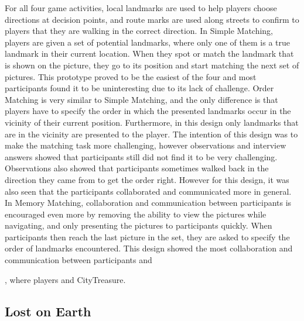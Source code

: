 For all four game activities, local landmarks are used to help players choose directions at decision points, and route marks are used along streets to confirm to players that they are walking in the correct direction. In Simple Matching, players are given a set of potential landmarks, where only one of them is a true landmark in their current location. When they spot or match the landmark that is shown on the picture, they go to its position and start matching the next set of pictures. This prototype proved to be the easiest of the four and most participants found it to be uninteresting due to its lack of challenge. Order Matching is very similar to Simple Matching, and the only difference is that players have to specify the order in which the presented landmarks occur in the vicinity of their current position. Furthermore, in this design only landmarks that are in the vicinity are presented to the player. The intention of this design was to make the matching task more challenging, however observations and interview answers showed that participants still did not find it to be very challenging. Observations also showed that participants sometimes walked back in the direction they came from to get the order right. However for this design, it was also seen that the participants collaborated and communicated more in general. In Memory Matching, collaboration and communication between participants is encouraged even more by removing the ability to view the pictures while navigating, and only presenting the pictures to participants quickly. When participants then reach the last picture in the set, they are asked to specify the order of landmarks encountered. This design showed the most collaboration and communication between participants and 





 , where players  and CityTreasure\cite{botturi2009city}. 

\subsection{Lost on Earth}
